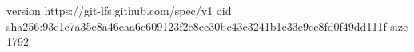 version https://git-lfs.github.com/spec/v1
oid sha256:93e1c7a35e8a46eaa6e609123f2e8cc30bc43c3241b1c33e9ec8fd0f49dd111f
size 1792
